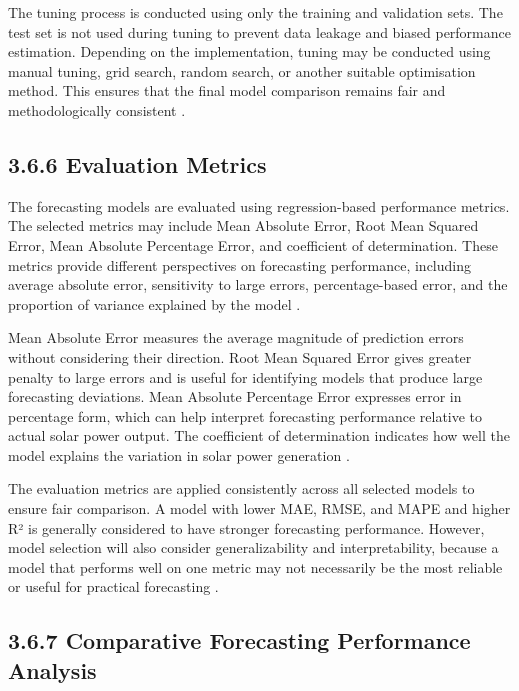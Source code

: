 The tuning process is conducted using only the training and validation sets. The test set is not used during tuning to prevent data leakage and biased performance estimation. Depending on the implementation, tuning may be conducted using manual tuning, grid search, random search, or another suitable optimisation method. This ensures that the final model comparison remains fair and methodologically consistent \parencite{ArellanosTafur2025, CarvalhoJunior2025, Ma2025}.

\subsection{3.6.6 Evaluation Metrics}

The forecasting models are evaluated using regression-based performance metrics. The selected metrics may include Mean Absolute Error, Root Mean Squared Error, Mean Absolute Percentage Error, and coefficient of determination. These metrics provide different perspectives on forecasting performance, including average absolute error, sensitivity to large errors, percentage-based error, and the proportion of variance explained by the model \parencite{JnanaVarshitha2025, Alhassan2025, Duvuru2026}.

Mean Absolute Error measures the average magnitude of prediction errors without considering their direction. Root Mean Squared Error gives greater penalty to large errors and is useful for identifying models that produce large forecasting deviations. Mean Absolute Percentage Error expresses error in percentage form, which can help interpret forecasting performance relative to actual solar power output. The coefficient of determination indicates how well the model explains the variation in solar power generation \parencite{Bakht2025, TsaiLo2025, CarvalhoJunior2025}.

The evaluation metrics are applied consistently across all selected models to ensure fair comparison. A model with lower MAE, RMSE, and MAPE and higher R² is generally considered to have stronger forecasting performance. However, model selection will also consider generalizability and interpretability, because a model that performs well on one metric may not necessarily be the most reliable or useful for practical forecasting \parencite{ArellanosTafur2025, Eren2025, JnanaVarshitha2025}.

\subsection{3.6.7 Comparative Forecasting Performance Analysis}

